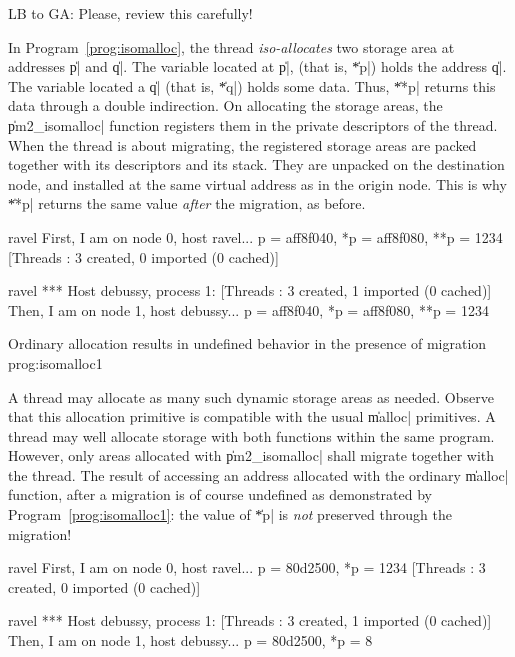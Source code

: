 \begin{note}
  LB to GA: Please, review this carefully!
\end{note}

In Program~\ref{prog:isomalloc}, the thread \emph{iso-allocates}
two storage area at addresses \|p| and \|q|. The variable located at
\|p|, (that is, \|*p|) holds the address \|q|. The variable located a
\|q| (that is, \|*q|) holds some data. Thus, \|**p| returns this
data through a double indirection. On allocating the storage areas, the
\|pm2_isomalloc| function registers them in the private descriptors of
the thread. When the thread is about migrating, the registered storage
areas are packed together with its descriptors and its stack. They are
unpacked on the destination node, and installed at the same virtual
address as in the origin node. This is why \|**p| returns the same
value \emph{after} the migration, as before. 
\begin{shell}
ravel%
First, I am on node 0, host ravel...
p = aff8f040, *p = aff8f080, **p = 1234
[Threads : 3 created, 0 imported (0 cached)]

ravel%
*** Host debussy, process 1:
[Threads : 3 created, 1 imported (0 cached)]
Then, I am on node 1, host debussy...
p = aff8f040, *p = aff8f080, **p = 1234
\end{shell}

 {Ordinary allocation results in
  undefined behavior in the presence of
  migration} {prog:isomalloc1}

A thread may allocate as many such dynamic storage areas as
needed. Observe that this allocation primitive is compatible with the
usual \|malloc| primitives. A thread may well allocate storage with
both functions within the same program. However, only areas allocated
with \|pm2_isomalloc| shall migrate together with the thread. The
result of accessing an address allocated with the ordinary \|malloc|
function, after a migration is of course undefined as demonstrated by
Program~\ref{prog:isomalloc1}: the value of \|*p| is \emph{not}
preserved through the migration!
\begin{shell}
ravel%
First, I am on node 0, host ravel...
p = 80d2500, *p = 1234
[Threads : 3 created, 0 imported (0 cached)]

ravel%
*** Host debussy, process 1:
[Threads : 3 created, 1 imported (0 cached)]
Then, I am on node 1, host debussy...
p = 80d2500, *p = 8
\end{shell}

